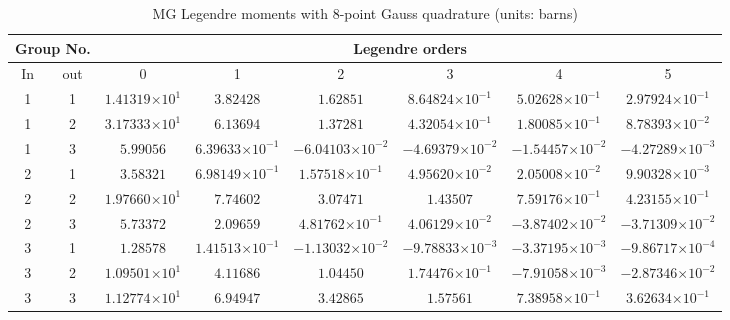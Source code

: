 \documentclass[review]{elsarticle}
\newcommand{\e}[1]{\ensuremath{\times10^{#1}}}
\begin{document}
\begin{table}[h]
\centering
\caption{MG Legendre moments with 8-point Gauss quadrature (units: barns)}\normalsize
\label{tb:8pt}
\scriptsize
\begin{adjustwidth}{-0.5cm}{}
\begin{tabular}{|c|c|c|c|c|c|c|c|}
\hline
\multicolumn{2}{|c|}{Group No.} & \multicolumn{6}{c|}{Legendre orders}\\
\hline
In & out & 0 & 1 & 2 & 3 & 4 & 5\\ 
\hline
1 & 1 & $1.41319\e{1}$ & $3.82428$ & $1.62851$ & $8.64824\e{-1}$ & $5.02628\e{-1}$ & $2.97924\e{-1}$\\
\hline
1 & 2 & $3.17333\e{1}$ & $6.13694$ & $1.37281$ & $4.32054\e{-1}$ & $1.80085\e{-1}$ & $8.78393\e{-2}$\\
\hline
1 & 3 & $5.99056$ & $6.39633\e{-1}$ & $-6.04103\e{-2}$ & $-4.69379\e{-2}$ & $-1.54457\e{-2}$ & $-4.27289\e{-3}$\\
\hline
2 & 1 & $3.58321$ & $6.98149\e{-1}$ & $1.57518\e{-1}$ & $4.95620\e{-2}$ & $2.05008\e{-2}$ & $9.90328\e{-3}$\\
\hline
2 & 2 & $1.97660\e{1}$ & $7.74602$ & $3.07471$ & $1.43507$ & $7.59176\e{-1}$ & $4.23155\e{-1}$\\
\hline
2 & 3 & $5.73372$ & $2.09659$ & $4.81762\e{-1}$ & $4.06129\e{-2}$ & $-3.87402\e{-2}$ & $-3.71309\e{-2}$\\
\hline
3 & 1 & $1.28578$ & $1.41513\e{-1}$ & $-1.13032\e{-2}$ & $-9.78833\e{-3}$ & $-3.37195\e{-3}$ & $-9.86717\e{-4}$\\
\hline
3 & 2 & $1.09501\e{1}$ & $4.11686$ & $1.04450$ & $1.74476\e{-1}$ & $-7.91058\e{-3}$ & $-2.87346\e{-2}$\\
\hline
3 & 3 & $1.12774\e{1}$ & $6.94947$ & $3.42865$ & $1.57561$ & $7.38958\e{-1}$ & $3.62634\e{-1}$\\
\hline
\end{tabular}
\end{adjustwidth}
\end{table}
\end{document}
